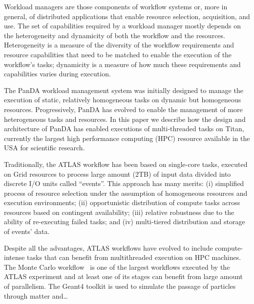 Workload managers are those components of workflow systems or, more in general,
of distributed applications that enable resource selection, acquisition, and
use. The set of capabilities required by a workload manager mostly depends on
the heterogeneity and dynamicity of both the workflow and the resources.
Heterogeneity is a measure of the diversity of the workflow requirements and
resource capabilities that need to be matched to enable the execution of the
workflow's tasks; dynamicity is a measure of how much these requirements and
capabilities varies during execution.

The PanDA workload management system was initially designed to manage the
execution of static, relatively homogeneous tasks on dynamic but homogeneous
resources. Progressively, PanDA has evolved to enable the management of more
heterogeneous tasks and resources. In this paper we describe how the design and
architecture of PanDA has enabled executions of multi-threaded tasks on Titan,
currently the largest high performance computing (HPC) resource available in the
USA for scientific research.

Traditionally, the ATLAS workflow has been based on single-core tasks, executed
on Grid resources to process large amount (2TB) of input data divided into
discrete I/O units called ``events''. This approach has many merits: (i)
simplified process of resource selection under the assumption of homogeneous
resources and execution environments; (ii) opportunistic distribution of compute
tasks across resources based on contingent availability; (iii) relative
robustness due to the ability of re-executing failed tasks; and (iv)
multi-tiered distribution and storage of events' data.

Despite all the advantages, ATLAS workflows have evolved to include
compute-intense tasks that can benefit from multithreaded execution on HPC
machines. The Monte Carlo workflow~\cite{} is one of the largest workflows
executed by the ATLAS experiment and at least one of its stages can benefit from
large amount of parallelism. The Geant4 toolkit is used to simulate the passage
of particles through matter and\ldots

